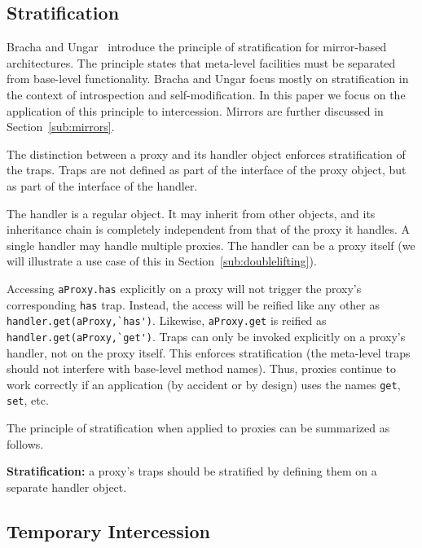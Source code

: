 \documentclass{sig-alternate}
\begin{document}
\subsection{Stratification}
\label{sub:stratification}

Bracha and Ungar~\cite{bracha04mirrors} introduce the principle of stratification for mirror-based architectures. The principle states that meta-level facilities must be separated from base-level functionality. Bracha and Ungar focus mostly on stratification in the context of introspection and self-modification. In this paper we focus on the application of this principle to intercession. Mirrors are further discussed in Section~\ref{sub:mirrors}.

The distinction between a proxy and its handler object enforces stratification of the traps. Traps are not defined as part of the interface of the proxy object, but as part of the interface of the handler.

The handler is a regular object. It may inherit from other objects, and its inheritance chain is completely independent from that of the proxy it handles. A single handler may handle multiple proxies. The handler can be a proxy itself (we will illustrate a use case of this in Section~\ref{sub:doublelifting}).

Accessing \lstinline{aProxy.has} explicitly on a proxy will not trigger the proxy's corresponding \texttt{has} trap. Instead, the access will be reified like any other as \lstinline{handler.get(aProxy,`has')}. Likewise, \lstinline{aProxy.get} is reified as \lstinline{handler.get(aProxy,`get')}. Traps can only be invoked explicitly on a proxy's handler, not on the proxy itself. This enforces stratification (the meta-level traps should not interfere with base-level method names). Thus, proxies continue to work correctly if an application (by accident or by design) uses the names \texttt{get}, \texttt{set}, etc.

The principle of stratification when applied to proxies can be summarized as follows.

\textbf{Stratification:} a proxy's traps should be stratified by defining them on a separate handler object.

\subsection{Temporary Intercession}
\label{sub:immutability}
\end{document}
